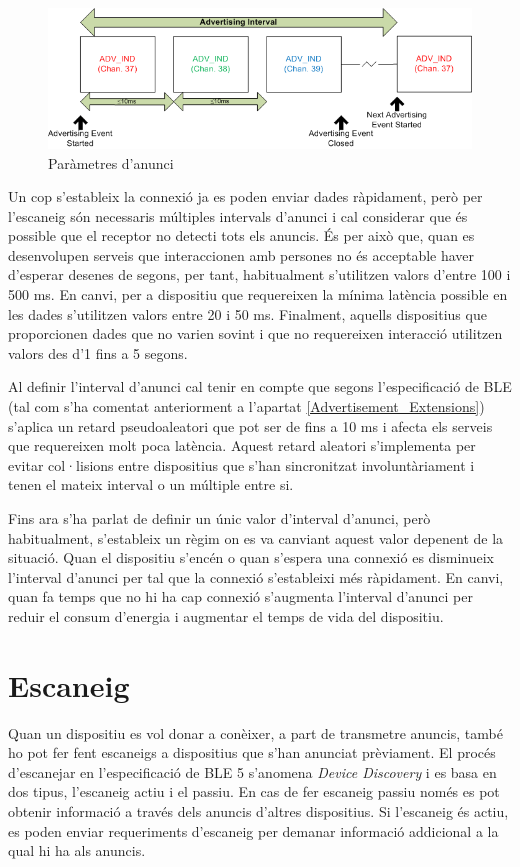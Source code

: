\begin{figure}[h!]
	\begin{center}
		\includegraphics{./images/advertisement_params.png}
		\caption{Paràmetres d'anunci \cite{advertisment_params}}
		\label{fig:advertisment_params}
	\end{center}
\end{figure}


Un cop s'estableix la connexió ja es poden enviar dades ràpidament, però per l'escaneig són necessaris múltiples intervals d'anunci i cal considerar que és possible que el receptor no detecti tots els anuncis. 
És per això que, quan es desenvolupen serveis que interaccionen amb persones no és acceptable haver d'esperar desenes de segons, per tant, habitualment s'utilitzen valors d'entre 100 i 500 ms.
En canvi, per a dispositiu que requereixen la mínima latència possible en les dades s'utilitzen valors entre 20 i 50 ms.
Finalment, aquells dispositius que proporcionen dades que no varien sovint i que no requereixen interacció utilitzen valors des d'1 fins a 5 segons.

Al definir l'interval d'anunci cal tenir en compte que segons l'especificació de BLE (tal com s'ha comentat anteriorment a l'apartat \ref{Advertisement_Extensions}) s'aplica un retard pseudoaleatori que pot ser de fins a 10 ms i afecta els serveis que requereixen molt poca latència.
Aquest retard aleatori s'implementa per evitar col·lisions entre dispositius que s'han sincronitzat involuntàriament i tenen el mateix interval o un múltiple entre si.

Fins ara s'ha parlat de definir un únic valor d'interval d'anunci, però habitualment, s'estableix un règim on es va canviant aquest valor depenent de la situació.
Quan el dispositiu s'encén o quan s'espera una connexió es disminueix l'interval d'anunci per tal que la connexió s'estableixi més ràpidament.
En canvi, quan fa temps que no hi ha cap connexió s'augmenta l'interval d'anunci per reduir el consum d'energia i augmentar el temps de vida del dispositiu. 


\section{Escaneig}
Quan un dispositiu es vol donar a conèixer, a part de transmetre anuncis, també ho pot fer fent escaneigs a dispositius que s'han anunciat prèviament.
El procés d'escanejar en l'especificació de BLE 5 s'anomena \textit{Device Discovery} i es basa en dos tipus, l'escaneig actiu i el passiu.
En cas de fer escaneig passiu només es pot obtenir informació a través dels anuncis d'altres dispositius.
Si l'escaneig és actiu, es poden enviar requeriments d'escaneig per demanar informació addicional a la qual hi ha als anuncis.


